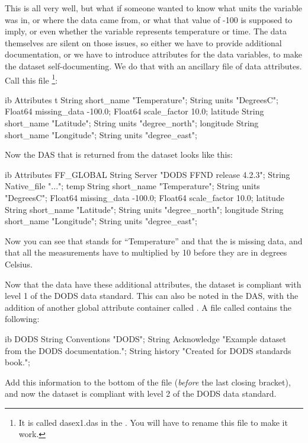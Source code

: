 This is all very well, but what if someone wanted to know what units
the  variable was in, or where the data came from, or what that
value of -100 is supposed to imply, or even whether the variable
represents temperature or time.  The data themselves are silent on
those issues, so either we have to provide additional documentation,
or we have to introduce attributes for the data variables, to make the
dataset self-documenting.  We do that with an ancillary file of data
attributes.  Call this file \footnote{It is called
  dasex1.das in the \DODSexamples .  You will have to rename this file
  to make it work.}:

\begin{vcode}{ib}
Attributes {
  t {
    String short_name "Temperature";
    String units "DegreesC";
    Float64 missing_data -100.0;
    Float64 scale_factor 10.0;
  }
  latitude {
    String short_name "Latitude";
    String units "degree_north";
  }
  longitude {
    String short_name "Longitude";
    String units "degree_east";
  }
}
\end{vcode}

Now the DAS that is returned from the dataset looks like this:

\begin{vcode}{ib}
Attributes {
    FF_GLOBAL {
        String Server "DODS FFND release 4.2.3";
        String Native_file "...";
    }
    temp {
        String short_name "Temperature";
        String units "DegreesC";
        Float64 missing_data -100.0;
        Float64 scale_factor 10.0;
    }
    latitude {
        String short_name "Latitude";
        String units "degree_north";
    }
    longitude {
        String short_name "Longitude";
        String units "degree_east";
    }
}
\end{vcode}

Now you can see that  stands for ``Temperature'' and that the
 is missing data, and that all the measurements have to
multiplied by 10 before they are in degrees Celsius.

Now that the data have these additional attributes, the dataset is
compliant with level 1 of the DODS data standard.  This can also be
noted in the DAS, with the addition of another global attribute
container called .  A file called  contains
the following:

\begin{vcode}{ib}
DODS {
  String Conventions "DODS";
  String Acknowledge "Example dataset from the DODS documentation.";
  String history "Created for DODS standards book.";
}
\end{vcode}

Add this information to the bottom of the  file
(\emph{before} the last closing bracket), and now the dataset is
compliant with level 2 of the DODS data standard.



